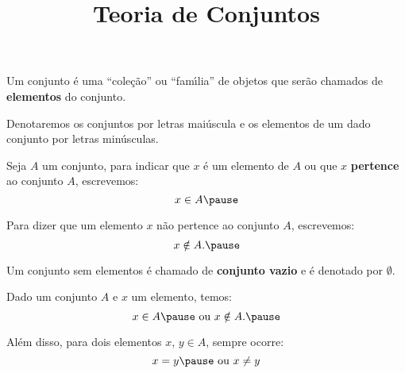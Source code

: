 \documentclass{beamer}
\title{Teoria de Conjuntos}
\author[\autor]{\autor}
\institute[\instituto]{\instituto}
\date{}
\begin{document}
    \begin{frame}
        \maketitle
    \end{frame}


    \begin{frame}
        \vspace{.4cm}
        Um conjunto {\'e} uma ``cole{\c c}{\~a}o'' ou ``fam{\'\i}lia'' de objetos que ser\~ao chamados de \textbf{elementos} do conjunto.\pause

        \vspace{.4cm}

        Denotaremos os conjuntos por letras mai\'uscula e os elementos de um dado conjunto por letras min{\'u}sculas.\pause

        \vspace{.4cm}
        Seja $A$ um conjunto, para indicar que $x$ {\'e} um elemento de $A$ ou que $x$ \textbf{pertence} ao conjunto $A$, \pause escrevemos:
        \[
            x \in A\pause
        \]

        Para dizer que um elemento $x$ n{\~a}o pertence ao conjunto $A$, escrevemos:
        \[
            x \notin A.\pause
        \]
    \end{frame}

    \begin{frame}
        Um conjunto sem elementos {\'e} chamado de \textbf{conjunto vazio} e {\'e} denotado por $\emptyset$.\pause

        \vspace{.4cm}
        Dado um conjunto $A$ e $x$ um elemento, temos:\pause
        \[
            x \in A\pause \mbox{ ou } x \notin A.\pause
        \]

        Al{\'e}m disso, para dois elementos $x$, $y \in A$, sempre ocorre:\pause
        \[
            x = y\pause \mbox{ ou } x \neq y
        \]
    \end{frame}
\end{document}

